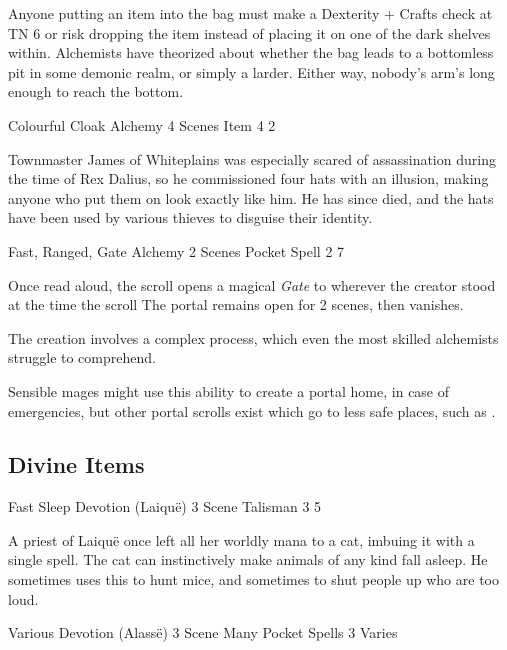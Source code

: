 \begin{multicols}{2}
Anyone putting an item into the bag must make a Dexterity + Crafts check at TN 6 or risk dropping the item instead of placing it on one of the dark shelves within.
Alchemists have theorized about whether the bag leads to a bottomless pit in some demonic realm, or simply a larder.
Either way, nobody's arm's long enough to reach the bottom.

	{Colourful Cloak}%
	{Alchemy}%
	{4 Scenes}%
	{Item}%
	{4}%
	{2}%

Townmaster James of Whiteplains was especially scared of assassination during the time of Rex Dalius, so he commissioned four hats with an illusion, making anyone who put them on look exactly like him.
He has since died, and the hats have been used by various thieves to disguise their identity.

	{Fast, Ranged, Gate}%
	{Alchemy}%
	{2 Scenes}%
	{Pocket Spell}%
	{2}%
	{7}%

\label{portalscroll}

Once read aloud, the scroll opens a magical \textit{Gate} to wherever the creator stood at the time the scroll 
The portal remains open for 2 scenes, then vanishes.

The creation involves a complex process, which even the most skilled alchemists struggle to comprehend.

Sensible mages might use this ability to create a portal home, in case of emergencies, but other portal scrolls exist which go to less safe places, such as .

\subsection{Divine Items}

	{Fast Sleep}%
	{Devotion (Laiqu\"{e})}%
	{3 Scene}%
	{Talisman}%
	{3}%
	{5}%

A priest of Laiqu\"{e} once left all her worldly mana to a cat, imbuing it with a single spell.
The cat can instinctively make animals of any kind fall asleep.
He sometimes uses this to hunt mice, and sometimes to shut people up who are too loud.

	{Various}%
	{Devotion (Alass\"{e})}%
	{3 Scene}%
	{Many Pocket Spells}%
	{3}%
	{Varies}\label{deckofmanythings}%


\end{multicols}
